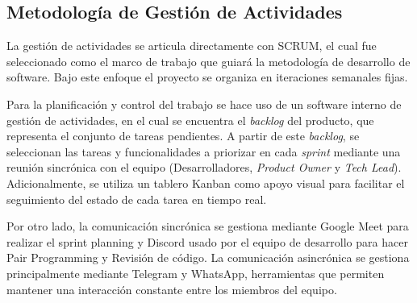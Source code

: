 \subsection{Metodología de Gestión de Actividades}

La gestión de actividades se articula directamente con SCRUM, el cual fue seleccionado como el marco de trabajo que guiará la metodología de desarrollo de software. Bajo este enfoque el proyecto se organiza en iteraciones semanales fijas.

Para la planificación y control del trabajo se hace uso de un software interno de gestión de actividades, en el cual se encuentra el \textit{backlog} del producto, que representa el conjunto de tareas pendientes. A partir de este \textit{backlog}, se seleccionan las tareas y funcionalidades a priorizar en cada \textit{sprint} mediante una reunión sincrónica con el equipo (Desarrolladores, \textit{Product Owner} y  \textit{Tech Lead}). Adicionalmente, se utiliza un tablero Kanban como apoyo visual para facilitar el seguimiento del estado de cada tarea en tiempo real.

Por otro lado, la comunicación sincrónica se gestiona mediante Google Meet para realizar el sprint planning y Discord usado por el equipo de desarrollo para hacer Pair Programming y Revisión de código. La comunicación asincrónica se gestiona principalmente mediante Telegram y WhatsApp, herramientas que permiten mantener una interacción constante entre los miembros del equipo.
